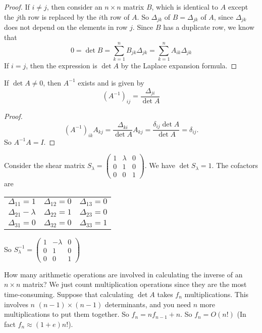 \documentclass[a4paper]{article}
\begin{document}
\begin{proof}
  If $i \not= j$, then consider an $n\times n$ matrix $B$, which is identical to $A$ except the $j$th row is replaced by the $i$th row of $A$. So $\Delta_{jk}$ of $B = \Delta_{jk}$ of $A$, since $\Delta_{jk}$ does not depend on the elements in row $j$. Since $B$ has a duplicate row, we know that
  \[
  0 = \det B = \sum_{k = 1}^n B_{jk}\Delta_{jk} = \sum_{k = 1}^n A_{ik}\Delta_{jk}
  \]
  If $i = j$, then the expression is $\det A$ by the Laplace expansion formula.
\end{proof}

\begin{thm}
  If $\det A \not =0$, then $A^{-1}$ exists and is given by
  \[
  (A^{-1})_{ij} = \frac{\Delta_{ji}}{\det A}
  \]
\end{thm}

\begin{proof}
  \[
  (A^{-1})_{ik}A_{kj} = \frac{\Delta_{ki}}{\det A} A_{kj} = \frac{\delta_{ij}\det A}{\det A} = \delta_{ij}.
  \]
  So $A^{-1}A = I$.
\end{proof}

\begin{eg}
  Consider the shear matrix $S_\lambda = \begin{pmatrix} 1 & \lambda & 0 \\ 0 & 1 & 0\\ 0 & 0 & 1\end{pmatrix}$. We have $\det{S_\lambda} = 1$. The cofactors are\\
    \begin{tabular}{ccc}
      $\Delta_{11} = 1$       & $\Delta_{12} = 0$ & $\Delta_{13} = 0$ \\
      $\Delta_{21} - \lambda$ & $\Delta_{22} = 1$ & $\Delta_{23} = 0$ \\
      $\Delta_{31} = 0$       & $\Delta_{32} = 0$ & $\Delta_{33} = 1$
    \end{tabular}

    So $S_\lambda^{-1} = \begin{pmatrix} 1 & -\lambda & 0\\ 0 & 1 & 0\\ 0 & 0 & 1\end{pmatrix}$
\end{eg}

How many arithmetic operations are involved in calculating the inverse of an $n\times n$ matrix? We just count multiplication operations since they are the most time-consuming. Suppose that calculating $\det A$ takes $f_n$ multiplications. This involves $n$ $(n - 1)\times (n - 1)$ determinants, and you need $n$ more multiplications to put them together. So $f_n = nf_{n -1} + n$. So $f_n = O(n!)$ (In fact $f_n \approx (1 + e)n!$).
\end{document}
